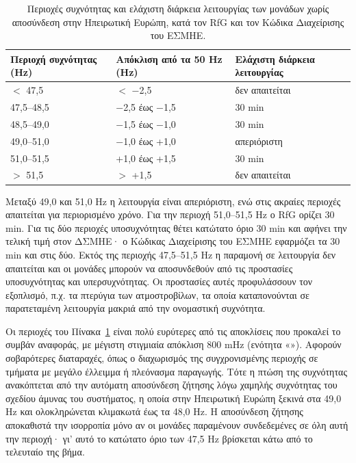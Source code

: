 \begin{table}[!htbp]
\centering
\begin{tabular}{lll}
\hline
\textbf{Περιοχή συχνότητας (Hz)} & \textbf{Απόκλιση από τα 50 Hz (Hz)}
& \textbf{Ελάχιστη διάρκεια λειτουργίας} \\
\hline
$<$ 47,5 & $<$ −2,5 & δεν απαιτείται \\
47,5--48,5 & −2,5 έως −1,5 & 30 min \\
48,5--49,0 & −1,5 έως −1,0 & 30 min \\
49,0--51,0 & −1,0 έως +1,0 & απεριόριστη \\
51,0--51,5 & +1,0 έως +1,5 & 30 min \\
$>$ 51,5 & $>$ +1,5 & δεν απαιτείται \\
\hline
\end{tabular}
\caption{Περιοχές συχνότητας και ελάχιστη διάρκεια λειτουργίας των μονάδων χωρίς αποσύνδεση
στην Ηπειρωτική Ευρώπη, κατά τον RfG και τον Κώδικα Διαχείρισης του ΕΣΜΗΕ.}
\label{tab:f-ranges}
\end{table}

Μεταξύ 49,0 και 51,0 Hz η λειτουργία είναι απεριόριστη, ενώ στις ακραίες περιοχές απαιτείται
για περιορισμένο χρόνο. Για την περιοχή 51,0--51,5 Hz ο RfG ορίζει 30 min. Για τις δύο
περιοχές υποσυχνότητας θέτει κατώτατο όριο 30 min και αφήνει την τελική τιμή στον ΔΣΜΗΕ· ο
Κώδικας Διαχείρισης του ΕΣΜΗΕ εφαρμόζει τα 30 min και στις δύο. Εκτός της περιοχής
47,5--51,5 Hz η παραμονή σε λειτουργία δεν απαιτείται και οι μονάδες μπορούν να αποσυνδεθούν
από τις προστασίες υποσυχνότητας και υπερσυχνότητας. Οι προστασίες αυτές προφυλάσσουν τον
εξοπλισμό, π.χ. τα πτερύγια των ατμοστροβίλων, τα οποία καταπονούνται σε παρατεταμένη
λειτουργία μακριά από την ονομαστική συχνότητα.

Οι περιοχές του Πίνακα~\ref{tab:f-ranges} είναι πολύ ευρύτερες από τις αποκλίσεις που
προκαλεί το συμβάν αναφοράς, με μέγιστη στιγμιαία απόκλιση 800 mHz (ενότητα
«»). Αφορούν σοβαρότερες διαταραχές, όπως ο διαχωρισμός της
συγχρονισμένης περιοχής σε τμήματα με μεγάλο έλλειμμα ή πλεόνασμα παραγωγής. Τότε η πτώση της
συχνότητας ανακόπτεται από την αυτόματη αποσύνδεση ζήτησης λόγω χαμηλής συχνότητας του
σχεδίου άμυνας του συστήματος, η οποία στην Ηπειρωτική Ευρώπη ξεκινά στα 49,0 Hz και
ολοκληρώνεται κλιμακωτά έως τα 48,0 Hz. Η αποσύνδεση ζήτησης αποκαθιστά την ισορροπία μόνο
αν οι μονάδες παραμένουν συνδεδεμένες σε όλη αυτή την περιοχή· γι' αυτό το κατώτατο όριο των
47,5 Hz βρίσκεται κάτω από το τελευταίο της βήμα.

